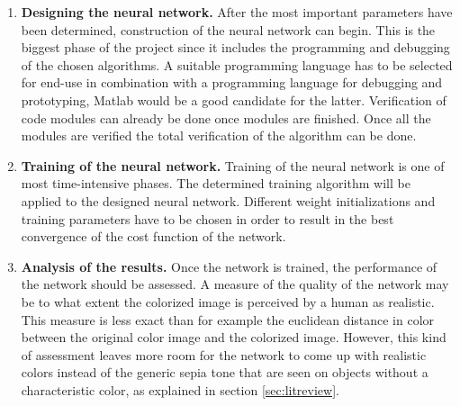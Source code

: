 \begin{enumerate}
\item \textbf{Designing the neural network.}
After the most important parameters have been determined, construction of the neural network can begin. This is the biggest phase of the project since it includes the programming and debugging of the chosen algorithms. A suitable programming language has to be selected for end-use in combination with a programming language for debugging and prototyping, Matlab would be a good candidate for the latter. Verification of code modules can already be done once modules are finished. Once all the modules are verified the total verification of the algorithm can be done.
\item \textbf{Training of the neural network.}
Training of the neural network is one of most time-intensive phases. The determined training algorithm will be applied to the designed neural network. Different weight initializations and training parameters have to be chosen in order to result in the best convergence of the cost function of the network. 

\item \textbf{Analysis of the results.}
Once the network is trained, the performance of the network should be assessed. A measure of the quality of the network may be to what extent the colorized image is perceived by a human as realistic. This measure is less exact than for example the euclidean distance in color between the original color image and the colorized image. However, this kind of assessment leaves more room for the network to come up with realistic colors instead of the generic sepia tone that are seen on objects without a characteristic color, as explained in section \ref{sec:litreview}.
\end{enumerate}





